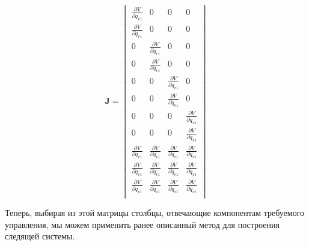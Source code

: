 \begin{equation}
\textbf{J} = 
\begin{vmatrix}

\frac{\partial{V}}{\partial{\dot{q}_{v1}}} & 0 & 0 & 0 \\
\frac{\partial{V}}{\partial{\dot{q}_{v1}}} & 0 & 0 & 0 \\
0 & \frac{\partial{V}}{\partial{\dot{q}_{v1}}} & 0 & 0 \\
0 & \frac{\partial{V}}{\partial{\dot{q}_{v1}}} & 0 & 0 \\
0 & 0 & \frac{\partial{V}}{\partial{\dot{q}_{v1}}} & 0 \\
0 & 0 & \frac{\partial{V}}{\partial{\dot{q}_{v1}}} & 0 \\
0 & 0 & 0 & \frac{\partial{V}}{\partial{\dot{q}_{v1}}} \\
0 & 0 & 0 & \frac{\partial{V}}{\partial{\dot{q}_{v1}}} \\
\frac{\partial{V}}{\partial{\dot{q}_{v1}}} &
\frac{\partial{V}}{\partial{\dot{q}_{v1}}} &
\frac{\partial{V}}{\partial{\dot{q}_{v1}}} &
\frac{\partial{V}}{\partial{\dot{q}_{v1}}} \\

\frac{\partial{V}}{\partial{\dot{q}_{v1}}} &
\frac{\partial{V}}{\partial{\dot{q}_{v1}}} &
\frac{\partial{V}}{\partial{\dot{q}_{v1}}} &
\frac{\partial{V}}{\partial{\dot{q}_{v1}}} \\

\frac{\partial{V}}{\partial{\dot{q}_{v1}}} &
\frac{\partial{V}}{\partial{\dot{q}_{v1}}} &
\frac{\partial{V}}{\partial{\dot{q}_{v1}}} &
\frac{\partial{V}}{\partial{\dot{q}_{v1}}} \\

\end{vmatrix}
\end{equation}

Теперь, выбирая из этой матрицы столбцы, отвечающие компонентам требуемого управления, мы можем применить ранее описанный метод для построения следящей системы. 